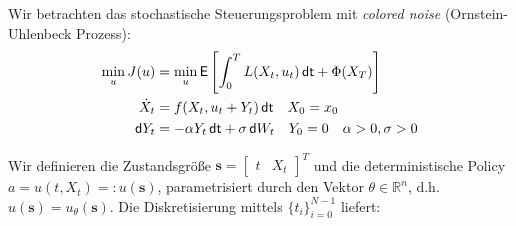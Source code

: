 \documentclass[a4paper, 12pt]{scrartcl}
\newcommand{\dt}{\thinspace \mathsf{dt}}
\newcommand{\dW}{\thinspace \mathsf{d}W}
\newcommand{\dY}{\thinspace \mathsf{d}Y}
\begin{document}
Wir betrachten das stochastische Steuerungsproblem mit \textit{colored noise} (Ornstein-Uhlenbeck Prozess): 
%
\begin{align*}
    \min_u J(u)
    &=
    \min_{u} 
    \mathsf{E}
    \left[
        \int_{0}^{T} L(X_t, u_t) \dt + \Phi(X_T)
    \right]
    \\
    \dot{X}_t &= f(X_t,u_t+ Y_t) \dt 
    \quad X_0 = x_0
    \\
    \dY_t &= - \alpha Y_t  \dt + \sigma \dW_t \quad Y_0 = 0
    \quad \alpha > 0, \sigma > 0 
\end{align*}

Wir definieren die Zustandsgröße $\bm{s} = \begin{bmatrix} t & X_{t} \end{bmatrix}^T$ und die 
deterministische Policy $a = u(t,X_t) =: u(\bm{s})$,
parametrisiert durch den Vektor $\theta \in \mathbb{R}^n$, 
d.h. $u(\bm{s}) =u_\theta (\bm{s})$. 
Die Diskretisierung mittels $\{t_i \}_{i=0}^{N-1}$ liefert:
\end{document}

